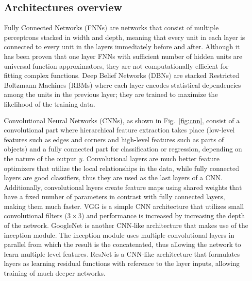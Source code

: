 \documentclass[journal]{IEEEtran}
\begin{document}
\subsection{Architectures overview}
Fully Connected Networks (FNNs) are networks that consist of multiple perceptrons stacked in width and depth, meaning that every unit in each layer is connected to every unit in the layers immediately before and after.
Although it has been proven\cite{hornik1989multilayer} that one layer FNNs with sufficient number of hidden units are universal function approximators, they are not computationally efficient for fitting complex functions.
Deep Belief Networks (DBNs)\cite{hinton2006fast} are stacked Restricted Boltzmann Machines (RBMs) where each layer encodes statistical dependencies among the units in the previous layer; they are trained to maximize the likelihood of the training data.

Convolutional Neural Networks (CNNs), as shown in Fig.~\ref{fig:cnn}, consist of a convolutional part where hierarchical feature extraction takes place (low-level features such as edges and corners and high-level features such as parts of objects) and a fully connected part for classification or regression, depending on the nature of the output $y$.
Convolutional layers are much better feature optimizers that utilize the local relationships in the data, while fully connected layers are good classifiers, thus they are used as the last layers of a CNN\@.
Additionally, convolutional layers create feature maps using shared weights that have a fixed number of parameters in contrast with fully connected layers, making them much faster.
VGG\cite{simonyan2014very} is a simple CNN architecture that utilizes small convolutional filters ($3\times 3$) and performance is increased by increasing the depth of the network.
GoogleNet\cite{szegedy2015going} is another CNN-like architecture that makes use of the inception module.
The inception module uses multiple convolutional layers in parallel from which the result is the concatenated, thus allowing the network to learn multiple level features.
ResNet\cite{he2016deep} is a CNN-like architecture that formulates layers as learning residual functions with reference to the layer inputs, allowing training of much deeper networks.
\end{document}
